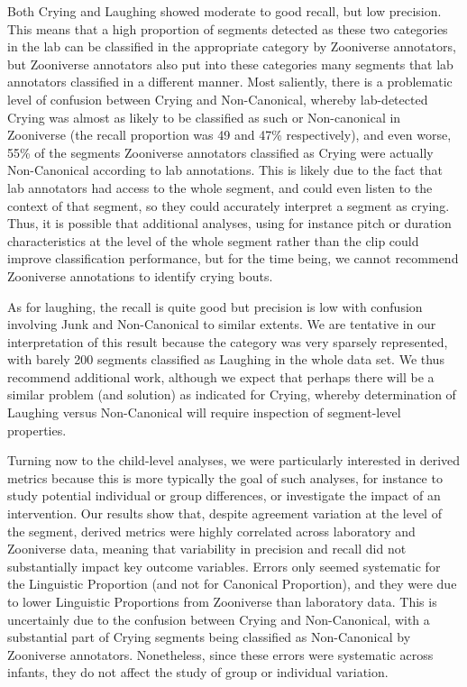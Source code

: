 \documentclass[english,,man,floatsintext]{apa6}
\begin{document}
Both Crying and Laughing showed moderate to good recall, but low precision. This means that a high proportion of segments detected as these two categories in the lab can be classified in the appropriate category by Zooniverse annotators, but Zooniverse annotators also put into these categories many segments that lab annotators classified in a different manner. Most saliently, there is a problematic level of confusion between Crying and Non-Canonical, whereby lab-detected Crying was almost as likely to be classified as such or Non-canonical in Zooniverse (the recall proportion was 49 and 47\% respectively), and even worse, 55\% of the segments Zooniverse annotators classified as Crying were actually Non-Canonical according to lab annotations. This is likely due to the fact that lab annotators had access to the whole segment, and could even listen to the context of that segment, so they could accurately interpret a segment as crying. Thus, it is possible that additional analyses, using for instance pitch or duration characteristics at the level of the whole segment rather than the clip could improve classification performance, but for the time being, we cannot recommend Zooniverse annotations to identify crying bouts.

As for laughing, the recall is quite good but precision is low with confusion involving Junk and Non-Canonical to similar extents. We are tentative in our interpretation of this result because the category was very sparsely represented, with barely 200 segments classified as Laughing in the whole data set. We thus recommend additional work, although we expect that perhaps there will be a similar problem (and solution) as indicated for Crying, whereby determination of Laughing versus Non-Canonical will require inspection of segment-level properties.

Turning now to the child-level analyses, we were particularly interested in derived metrics because this is more typically the goal of such analyses, for instance to study potential individual or group differences, or investigate the impact of an intervention. Our results show that, despite agreement variation at the level of the segment, derived metrics were highly correlated across laboratory and Zooniverse data, meaning that variability in precision and recall did not substantially impact key outcome variables. Errors only seemed systematic for the Linguistic Proportion (and not for Canonical Proportion), and they were due to lower Linguistic Proportions from Zooniverse than laboratory data. This is uncertainly due to the confusion between Crying and Non-Canonical, with a substantial part of Crying segments being classified as Non-Canonical by Zooniverse annotators. Nonetheless, since these errors were systematic across infants, they do not affect the study of group or individual variation.
\end{document}
